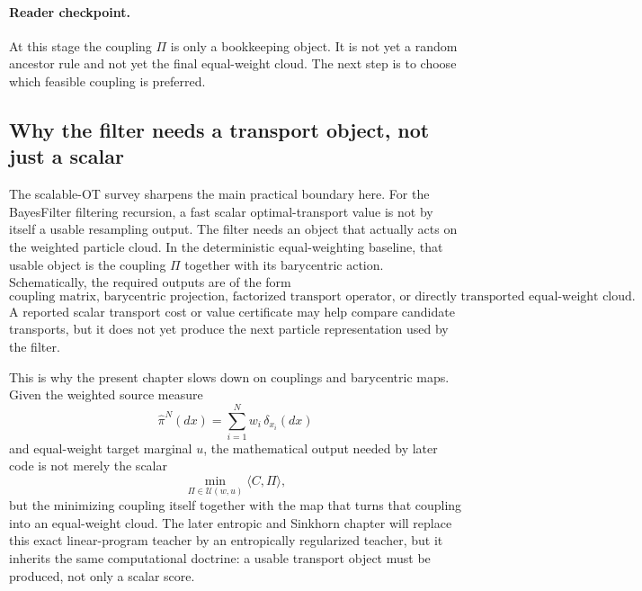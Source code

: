 \paragraph{Reader checkpoint.}
At this stage the coupling \(\Pi\) is only a bookkeeping object.  It is not yet a
random ancestor rule and not yet the final equal-weight cloud.  The next step is
to choose which feasible coupling is preferred.

\subsection{Why the filter needs a transport object, not just a scalar}
\label{sec:bf-ot-baseline-transport-object}

The scalable-OT survey sharpens the main practical boundary here.  For the
BayesFilter filtering recursion, a fast scalar optimal-transport value is not by
itself a usable resampling output.  The filter needs an object that actually acts
on the weighted particle cloud.  In the deterministic equal-weighting baseline,
that usable object is the coupling \(\Pi\) together with its barycentric action.
Schematically, the required outputs are of the form
\begin{equation}
\label{eq:bf-ot-baseline-usable-object}
  \text{coupling matrix, barycentric projection, factorized transport operator,}
  \text{ or directly transported equal-weight cloud.}
\end{equation}
A reported scalar transport cost or value certificate may help compare candidate
transports, but it does not yet produce the next particle representation used by
the filter.

This is why the present chapter slows down on couplings and barycentric maps.
Given the weighted source measure
\begin{equation}
\label{eq:bf-ot-baseline-source-measure-repeat}
  \hat\pi^N(dx)
  =
  \sum_{i=1}^N w_i\,\delta_{x_i}(dx)
\end{equation}
and equal-weight target marginal \(u\), the mathematical output needed by later
code is not merely the scalar
\begin{equation}
\label{eq:bf-ot-baseline-scalar-only}
  \min_{\Pi\in\mathcal U(w,u)} \langle C,\Pi\rangle,
\end{equation}
but the minimizing coupling itself together with the map that turns that coupling
into an equal-weight cloud.  The later entropic and Sinkhorn chapter will replace
this exact linear-program teacher by an entropically regularized teacher, but it
inherits the same computational doctrine: a usable transport object must be
produced, not only a scalar score.

